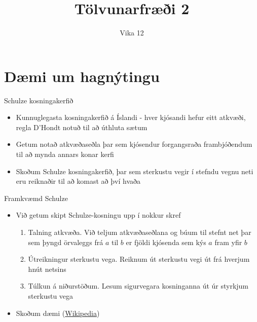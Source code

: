 \documentclass{beamer}
\title{Tölvunarfræði 2}
\subtitle{Vika 12}
\begin{document}
\begin{frame}
	\titlepage
\end{frame}

\section{Dæmi um hagnýtingu}

\begin{frame}{Schulze kosningakerfið}
	\begin{itemize}
		\item Kunnuglegasta kosningakerfið á Íslandi - hver kjósandi hefur eitt atkvæði, regla D'Hondt notuð til að úthluta sætum
		\item Getum notað atkvæðaseðla þar sem kjósendur forgangsraða frambjóðendum til að mynda annars konar kerfi
		\item Skoðum Schulze kosningakerfið, þar sem sterkustu vegir  í stefndu vegnu neti eru reiknaðir til að komast að því hvaða
	\end{itemize}
\end{frame}

\begin{frame}{Framkvæmd Schulze}
	\begin{itemize}
		\item Við getum skipt Schulze-kosningu upp í nokkur skref
		      \begin{enumerate}
			      \item Talning atkvæða. Við teljum atkvæðaseðlana og búum til stefnt net þar sem þyngd örvaleggs frá $a$ til $b$ er fjöldi kjósenda sem kýs $a$ fram yfir $b$
			      \item Útreikningur sterkustu vega. Reiknum út sterkustu vegi  út frá hverjum hnút netsins
			      \item Túlkun á niðurstöðum. Lesum sigurvegara kosninganna út úr styrkjum sterkustu vega
		      \end{enumerate}
		\item Skoðum dæmi (\href{https://en.wikipedia.org/wiki/Schulze_method}{Wikipedia})
	\end{itemize}
\end{frame}
\end{document}
